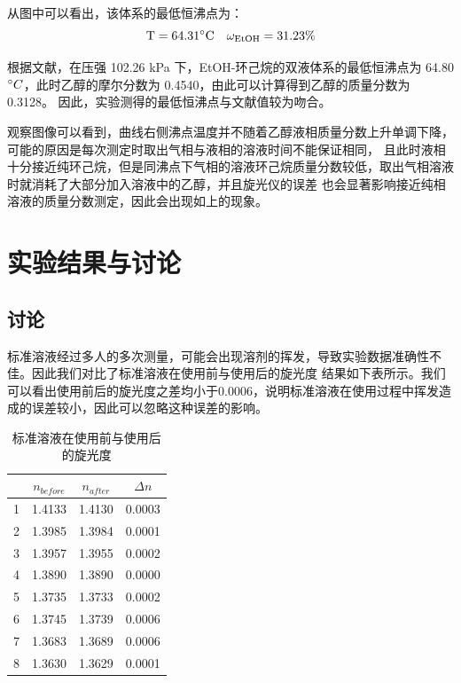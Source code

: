 \documentclass[cn,hazy,pku,12pt,normal,math=newtx,cite=super]{elegantnote}
\begin{document}
从图中可以看出，该体系的最低恒沸点为：
$$\rm 
T = 64.31 \degree C \quad \omega_{EtOH} = 31.23 \%
$$

根据文献\cite{r}，在压强 102.26 kPa 下，EtOH-环己烷的双液体系的最低恒沸点为 64.80 $\degree C
$，此时乙醇的摩尔分数为 0.4540，由此可以计算得到乙醇的质量分数为 0.3128。
因此，实验测得的最低恒沸点与文献值较为吻合。

观察图像可以看到，曲线右侧沸点温度并不随着乙醇液相质量分数上升单调下降，可能的原因是每次测定时取出气相与液相的溶液时间不能保证相同，
且此时液相十分接近纯环己烷，但是同沸点下气相的溶液环己烷质量分数较低，取出气相溶液时就消耗了大部分加入溶液中的乙醇，并且旋光仪的误差
也会显著影响接近纯相溶液的质量分数测定，因此会出现如上的现象。

\section{实验结果与讨论}

\subsection{讨论}

标准溶液经过多人的多次测量，可能会出现溶剂的挥发，导致实验数据准确性不佳。因此我们对比了标准溶液在使用前与使用后的旋光度
结果如下表所示。我们可以看出使用前后的旋光度之差均小于0.0006，说明标准溶液在使用过程中挥发造成的误差较小，因此可以忽略这种误差的影响。

\begin{table}[h]
    \centering
    \caption{标准溶液在使用前与使用后的旋光度}
    \label{06}
    \begin{tabular}{cccc}
    \hline
      & $n_{before}$ & $n_{after}$ & $\Delta n$ \\ \hline
    1 & 1.4133       & 1.4130      & 0.0003     \\
    2 & 1.3985       & 1.3984      & 0.0001     \\
    3 & 1.3957       & 1.3955      & 0.0002     \\
    4 & 1.3890       & 1.3890      & 0.0000     \\
    5 & 1.3735       & 1.3733      & 0.0002     \\
    6 & 1.3745       & 1.3739      & 0.0006     \\
    7 & 1.3683       & 1.3689      & 0.0006     \\
    8 & 1.3630       & 1.3629      & 0.0001     \\ \hline
    \end{tabular}
\end{table}
\end{document}
